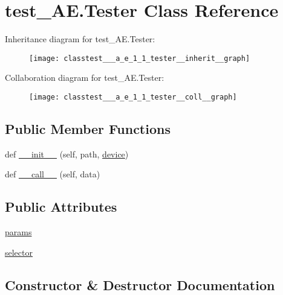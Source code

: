 \hypertarget{classtest___a_e_1_1_tester}{}\section{test\+\_\+\+A\+E.\+Tester Class Reference}
\label{classtest___a_e_1_1_tester}


Inheritance diagram for test\+\_\+\+A\+E.\+Tester\+:
\nopagebreak
\begin{figure}[H]
\begin{center}
\leavevmode
\texttt{[image: classtest\_\_\_a\_e\_1\_1\_tester\_\_inherit\_\_graph]}
\end{center}
\end{figure}


Collaboration diagram for test\+\_\+\+A\+E.\+Tester\+:
\nopagebreak
\begin{figure}[H]
\begin{center}
\leavevmode
\texttt{[image: classtest\_\_\_a\_e\_1\_1\_tester\_\_coll\_\_graph]}
\end{center}
\end{figure}
\subsection*{Public Member Functions}
\begin{DoxyCompactItemize}
\item 
def \hyperlink{classtest___a_e_1_1_tester_a3a004caa755969002bc4a3c7dde7511c}{\+\_\+\+\_\+init\+\_\+\+\_\+} (self, path, \hyperlink{namespacetest___a_e_a2fe4876a8ef1d5961b3a7238a439bed4}{device})
\item 
def \hyperlink{classtest___a_e_1_1_tester_a8085b5ff855ce6b9fc4e93cc0e5b38f6}{\+\_\+\+\_\+call\+\_\+\+\_\+} (self, data)
\end{DoxyCompactItemize}
\subsection*{Public Attributes}
\begin{DoxyCompactItemize}
\item 
\hyperlink{classtest___a_e_1_1_tester_a5c49ce0e6bd61c738502858281f1d201}{params}
\item 
\hyperlink{classtest___a_e_1_1_tester_af5de85608be686569340cadad3fce67b}{selector}
\end{DoxyCompactItemize}


\subsection{Constructor \& Destructor Documentation}
